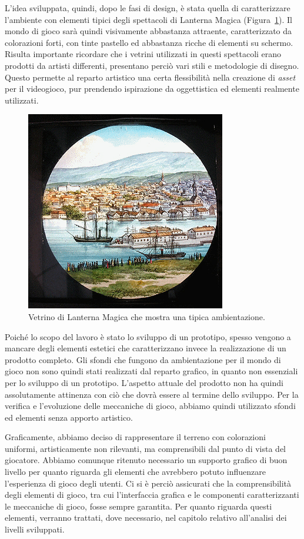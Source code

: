 L’idea sviluppata, quindi, dopo le fasi di design, è stata quella di caratterizzare l’ambiente con elementi tipici degli spettacoli di Lanterna Magica (Figura~\ref{fig:ambientazione_lanterna}). Il mondo di gioco sarà quindi visivamente abbastanza attraente, caratterizzato da colorazioni forti, con tinte pastello ed abbastanza ricche di elementi su schermo. Risulta importante ricordare che i vetrini utilizzati in questi spettacoli erano prodotti da artisti differenti, presentano perciò vari stili e metodologie di disegno. Questo permette al reparto artistico una certa flessibilità nella creazione di \textit{asset} per il videogioco, pur prendendo ispirazione da oggettistica ed elementi realmente utilizzati.

\begin{figure}%
	\centering
	\includegraphics[width= 0.5\columnwidth]{images/gameDesign/29_lanterna.jpg}
	\caption{Vetrino di Lanterna Magica che mostra una tipica ambientazione.}
	\label{fig:ambientazione_lanterna}
\end{figure} 

Poiché lo scopo del lavoro è stato lo sviluppo di un prototipo, spesso vengono a mancare degli elementi estetici che caratterizzano invece la realizzazione di un prodotto completo. Gli sfondi che fungono da ambientazione per il mondo di gioco non sono quindi stati realizzati dal reparto grafico, in quanto non essenziali per lo sviluppo di un prototipo.
L’aspetto attuale del prodotto non ha quindi assolutamente attinenza con ciò che dovrà essere al termine dello sviluppo.
Per la verifica e l’evoluzione delle meccaniche di gioco, abbiamo quindi utilizzato sfondi ed elementi senza apporto artistico.

Graficamente, abbiamo deciso di rappresentare il terreno con colorazioni uniformi, artisticamente non rilevanti, ma comprensibili dal punto di vista del giocatore.
Abbiamo comunque ritenuto necessario un supporto grafico di buon livello per quanto riguarda gli elementi che avrebbero potuto influenzare l’esperienza di gioco degli utenti. Ci si è perciò assicurati che la comprensibilità degli elementi di gioco, tra cui l’interfaccia grafica e le componenti caratterizzanti le meccaniche di gioco, fosse sempre garantita.
Per quanto riguarda questi elementi, verranno trattati, dove necessario, nel capitolo relativo all’analisi dei livelli sviluppati.

